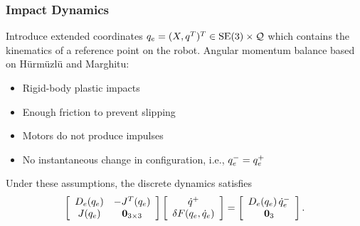\begin{frame}[t]
  \frametitle{Impact Dynamics}
  Introduce extended coordinates $q_{e} = (X, q^{T})^{T} \in \mathrm{SE}(3) \times \mathcal{Q}$ which contains the kinematics of a reference point on the robot. Angular momentum balance based on H{\"u}rm{\"u}zl{\"u} and Marghitu:
  \begin{massump}
    \begin{itemize}
    \item Rigid-body plastic impacts
    \item Enough friction to prevent slipping
    \item Motors do not produce impulses
    \item No instantaneous change in configuration, i.e., $q_{e}^{-} = q_{e}^{+}$
    \end{itemize}
  \end{massump}
  Under these assumptions, the discrete dynamics satisfies
  \begin{align*}
    \left[\begin{array}{c c}
        D_{e}(q_{e}) & -J^{T}(q_{e})\\
        J(q_{e}) & \mathbf{0}_{3 \times 3}
      \end{array}\right]
    \left[\begin{array}{c}
        \dot q^{+}\\
        \delta F(q_{e}, \dot q_{e})
      \end{array}\right]
    = \left[\begin{array}{c c}
        D_{e}(q_{e}) \, \dot q_{e}^{-}\\
        \mathbf{0}_{3}
      \end{array}\right].
  \end{align*}
\end{frame}

